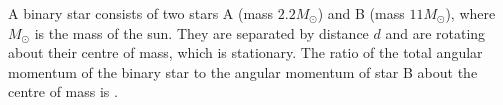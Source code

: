 
\item A binary star consists of two stars A (mass \(2.2M_{\odot}\)) and B (mass \(11M_{\odot}\)), where \(M_{\odot}\) is the mass of the sun. They are separated by distance \(d\) and are rotating about their centre of mass, which is stationary. The ratio of the total angular momentum of the binary star to the angular momentum of star B about the centre of mass is \underline{\hspace{2.5cm}}.
